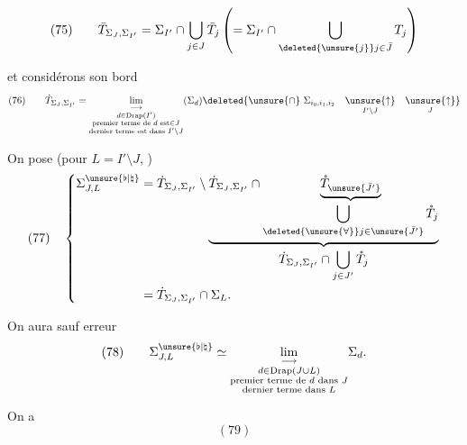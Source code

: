
\[
(75)\qquad\bar T_{\Sigma_J,\Sigma_{I'}}=\Sigma_{I'}\cap\bigcup_{j\in J}\bar T_j\left(=\Sigma_{I'}\cap\bigcup_{\deleted{\unsure{j}}j\in\bar J}T_j\right)
\]

et considérons son bord
\[
(76)\qquad\dot T_{\Sigma_J,\Sigma_{I'}}=
\underset{\substack{d\in\mathrm{Drap}(I')\\\text{premier terme de }d\text{ est}\in J\\\text{dernier terme est dans }I'\setminus J}}{\lim_{\longrightarrow}}(\Sigma_d)
\deleted{\unsure{\cap}\ \Sigma_{i_0,i_1,i_2}\quad\underset{I'\setminus J}{\unsure{\uparrow}}\quad\underset{J}{\unsure{\uparrow}}}
\]

On pose (pour $L=I'\setminus J$, )
\[
(77)\quad\left\{
\begin{aligned}
\Sigma_{J,L}^{\unsure{\flat|\natural}}&=\dot T_{\Sigma_J,\Sigma_{I'}}\setminus
\underbrace{\dot T_{\Sigma_J,\Sigma_{I'}}\cap
\underbrace{\mathring T_{\unsure{\bar J'}}}_{\displaystyle\bigcup_{\deleted{\unsure{\forall}}j\in\unsure{\bar J'}}\mathring T_j}}_{\displaystyle\dot T_{\Sigma_J,\Sigma_{I'}}\cap\bigcup_{j\in J'}\mathring T_j}\\
&=\dot T_{\Sigma_J,\Sigma_{I'}}\cap\Sigma_L.
\end{aligned}\right.
\]

On aura sauf erreur
\[
(78)\qquad\Sigma_{J,L}^{\unsure{\flat|\natural}}\simeq
\underset{\substack{d\in\mathrm{Drap}(J\cup L)\\\text{premier terme de }d\text{ dans }J\\\text{dernier terme dans }L}}{\lim_{\longrightarrow}}\Sigma_d.
\]

On a
\[
(79)
\]
